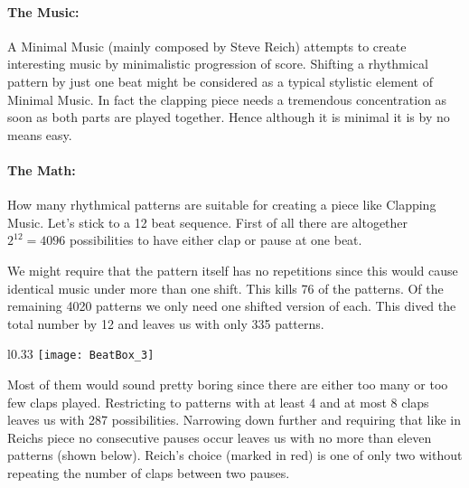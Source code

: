 \paragraph{The Music:}
A Minimal Music (mainly composed by Steve Reich) attempts to create interesting music by minimalistic progression of score. Shifting a rhythmical pattern by just one beat might be considered as a typical stylistic element of Minimal Music. In fact the clapping piece needs a tremendous concentration as soon as both parts are played together. Hence although it is minimal it is by no means easy.

\paragraph{The Math:} How many rhythmical patterns are suitable for creating a piece like Clapping Music. Let's stick to a 12 beat sequence. First of all there are altogether $2^{12} = 4096$ possibilities to have either clap or pause at one beat.

We might require that the pattern itself has no repetitions since this would cause identical music under more than one shift. This kills 76 of the patterns. Of the remaining 4020 patterns we only need one shifted version of each. This dived the total number by 12 and leaves us with only 335 patterns.

\begin{wrapfigure}[13]{l}{0.33\textwidth}
\centering
\texttt{[image: BeatBox\_3]}
\end{wrapfigure}

Most of them would sound pretty boring since there are either too many or too few claps played. Restricting to patterns with at least 4 and at most 8 claps leaves us with 287 possibilities. Narrowing down further and requiring that like in Reichs piece no consecutive pauses occur leaves us with no more than eleven patterns (shown below). Reich's choice (marked in red) is one of only two without repeating the number of claps between two pauses.


\hfill {}
